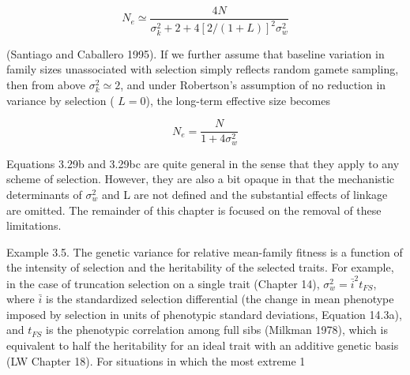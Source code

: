 \documentclass{article}
\begin{document}
\begin{equation}
N_{e}\simeq\frac{4N}{\sigma_{k}^{2}+2+4[2/(1+L)]^{2}\sigma_{w}^{2}}
\tag{3.29b}
\label{eq:3_29b}
\end{equation}

(Santiago and Caballero 1995). If we further assume that baseline variation in family sizes unassociated with selection simply reflects random gamete sampling, then from above  $ \sigma_k^2 \simeq 2 $, and under Robertson’s assumption of no reduction in variance by selection ( $ L = 0 $), the long-term effective size becomes

\begin{equation}
N_{e}=\frac{N}{1+4\sigma_{w}^{2}}
\tag{3.29c}
\label{eq:3_29c}
\end{equation}

Equations 3.29b and 3.29bc are quite general in the sense that they apply to any scheme of selection. However, they are also a bit opaque in that the mechanistic determinants of  $ \sigma_{w}^{2} $ and L are not defined and the substantial effects of linkage are omitted. The remainder of this chapter is focused on the removal of these limitations.

Example 3.5. The genetic variance for relative mean-family fitness is a function of the intensity of selection and the heritability of the selected traits. For example, in the case of truncation selection on a single trait (Chapter 14),  $ \sigma_w^2 = \bar{i}^2 t_{FS} $, where  $ \bar{i} $ is the standardized selection differential (the change in mean phenotype imposed by selection in units of phenotypic standard deviations, Equation 14.3a), and  $ t_{FS} $ is the phenotypic correlation among full sibs (Milkman 1978), which is equivalent to half the heritability for an ideal trait with an additive genetic basis (LW Chapter 18). For situations in which the most extreme 1%
\end{document}
